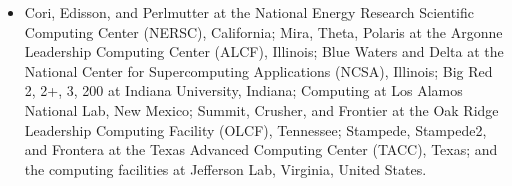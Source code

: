 \documentclass[a4paper,11pt]{article}
\begin{document}
\begin{itemize}[leftmargin=*, align=left, itemsep=1pt, topsep=0pt, parsep=0pt]
\item Cori, Edisson, and Perlmutter at the National Energy Research
  Scientific Computing Center (NERSC), California; Mira, Theta,
  Polaris at the Argonne Leadership Computing Center (ALCF), Illinois;
  Blue Waters and Delta at the National Center for Supercomputing
  Applications (NCSA), Illinois; Big Red 2, 2+, 3, 200 at Indiana
  University, Indiana; Computing at Los Alamos National Lab, New
  Mexico; Summit, Crusher, and Frontier at the Oak Ridge Leadership
  Computing Facility (OLCF), Tennessee; Stampede, Stampede2, and
  Frontera at the Texas Advanced Computing Center (TACC), Texas; and
  the computing facilities at Jefferson Lab, Virginia, United States.
\end{itemize}


 
\end{document}
